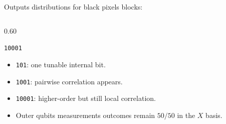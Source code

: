 \documentclass[aspectratio=169]{beamer}
\newcommand{\ket}[1]{\lvert #1\rangle}
\begin{document}
\begin{frame}{Outputs distributions for black pixels blocks:}
\begin{columns}[T,onlytextwidth]
\begin{column}{0.60\textwidth}
\begin{minipage}[t][0.72\textheight][t]{\linewidth}
\begin{block}{\texttt{10001}}
          \vspace{0.4em}
          \begin{itemize}
            \item \texttt{101}: one tunable internal bit.
            \item \texttt{1001}: pairwise correlation appears.
            \item \texttt{10001}: higher-order but still local correlation.
            \item Outer qubits measurements outcomes remain $50/50$ in the $X$ basis.
          \end{itemize}
        \end{block}
      \end{minipage}
    \end{column}
  \end{columns}
\end{frame}







\end{document}
